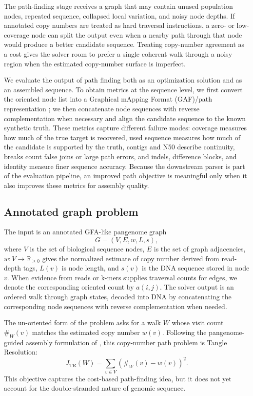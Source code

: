 \documentclass[11pt]{article}
\begin{document}
The path-finding stage receives a graph that may contain unused population nodes, repeated sequence, collapsed local variation, and noisy node depths. If annotated copy numbers are treated as hard traversal instructions, a zero- or low-coverage node can split the output even when a nearby path through that node would produce a better candidate sequence. Treating copy-number agreement as a cost gives the solver room to prefer a single coherent walk through a noisy region when the estimated copy-number surface is imperfect.

We evaluate the output of path finding both as an optimization solution and as an assembled sequence. To obtain metrics at the sequence level, we first convert the oriented node list into a Graphical mApping Format (GAF)/path representation \citep{li2020minigraph}; we then concatenate node sequences with reverse complementation when necessary and align the candidate sequence to the known synthetic truth. These metrics capture different failure modes: coverage measures how much of the true target is recovered, used sequence measures how much of the candidate is supported by the truth, contigs and N50 describe continuity, breaks count false joins or large path errors, and indels, difference blocks, and identity measure finer sequence accuracy. Because the downstream parser is part of the evaluation pipeline, an improved path objective is meaningful only when it also improves these metrics for assembly quality.

\subsection{Annotated graph problem}

The input is an annotated GFA-like pangenome graph
\begin{equation}
G=(V,E,w,L,s),
\end{equation}
where $V$ is the set of biological sequence nodes, $E$ is the set of graph adjacencies, $w:V\rightarrow\mathbb R_{\ge 0}$ gives the normalized estimate of copy number derived from read-depth tags, $L(v)$ is node length, and $s(v)$ is the DNA sequence stored in node $v$. When evidence from reads or k-mers supplies traversal counts for edges, we denote the corresponding oriented count by $a(i,j)$. The solver output is an ordered walk through graph states, decoded into DNA by concatenating the corresponding node sequences with reverse complementation when needed.

The un-oriented form of the problem asks for a walk $W$ whose visit count $\#_W(v)$ matches the estimated copy number $w(v)$. Following the pangenome-guided assembly formulation of \citet{cudby2026pangenome}, this copy-number path problem is Tangle Resolution:
\begin{equation}
J_{\mathrm{TR}}(W)=\sum_{v\in V}\left(\#_W(v)-w(v)\right)^2.
\end{equation}
This objective captures the cost-based path-finding idea, but it does not yet account for the double-stranded nature of genomic sequence.
\end{document}

